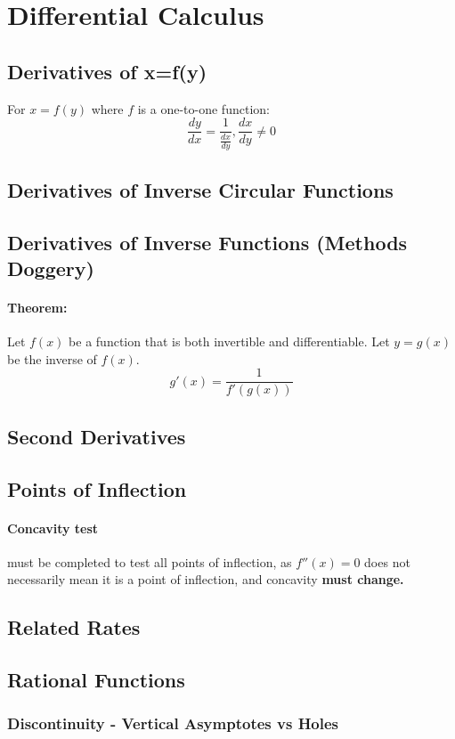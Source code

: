 \documentclass[a4paper,twoside,10pt]{article}
\begin{document}
	\section{Differential Calculus}			
		\subsection{Derivatives of x=f(y)}
			For $x=f(y)$ where $f$ is a one-to-one function:
			\[
				\frac{dy}{dx}=\frac{1}{\frac{dx}{dy}},\frac{dx}{dy}\neq0
			\]
		\subsection{Derivatives of Inverse Circular Functions}
		\subsection{Derivatives of Inverse Functions (Methods Doggery)}
			\paragraph{Theorem:} Let $f(x)$ be a function that is both invertible and differentiable. Let $y=g(x)$ be the inverse of $f(x)$.
			\[
				g'(x)=\frac{1}{f'(g(x))}
			\]
		\subsection{Second Derivatives}
		\subsection{Points of Inflection}
			\paragraph{Concavity test} must be completed to test all points of inflection, as $f''(x)=0$ does not necessarily mean it is a point of inflection, and concavity \textbf{must change.}
		\subsection{Related Rates}
		\subsection{Rational Functions}
			\subsubsection{Discontinuity - Vertical Asymptotes vs Holes}
\end{document}
